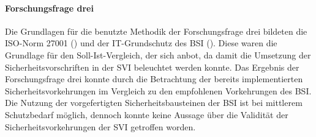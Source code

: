 \paragraph{Forschungsfrage drei}
Die Grundlagen für die benutzte Methodik der Forschungsfrage drei bildeten die ISO-Norm 27001 (\cite{dindeutsches_institut_fur_normung_informationstechnik_2020}) und der IT-Grundschutz des \ac{BSI} (\cite{bundesamt_fur_sicherheit_in_der_informationstechnik_bsi_it-grundschutz-kompendium_2020}). Diese waren die Grundlage für den Soll-Ist-Vergleich, der sich anbot, da damit die Umsetzung der Sicherheitsvorschriften in der \ac{SVI} beleuchtet werden konnte. Das Ergebnis der Forschungsfrage drei konnte durch die Betrachtung der bereits implementierten Sicherheitsvorkehrungen im Vergleich zu den empfohlenen Vorkehrungen des \ac{BSI}. Die Nutzung der vorgefertigten Sicherheitsbausteinen der \ac{BSI} ist bei mittlerem Schutzbedarf möglich, dennoch konnte keine Aussage über die Validität der Sicherheitsvorkehrungen der \ac{SVI} getroffen worden.  